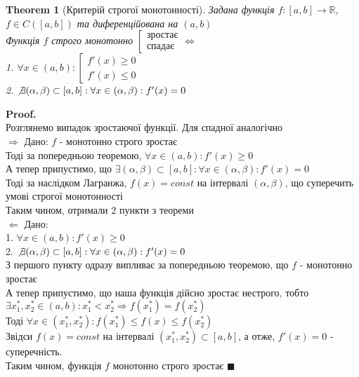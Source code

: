 \documentclass[a4paper, 14pt]{extarticle}
\def\bigline{\vspace{5mm}\\}
\def\rightproof{$\boxed{\Rightarrow}$ }
\def\leftproof{$\boxed{\Leftarrow}$ }
\theoremstyle{theoremdd}
\newtheorem{theorem}{Theorem}[subsection]
\theoremstyle{theoremdd}
\theoremstyle{theoremdd}
\theoremstyle{theoremdd}
\theoremstyle{theoremdd}
\theoremstyle{theoremdd}
\theoremstyle{theoremdd}
\theoremstyle{theoremdd}
\newenvironment{pf}{\vspace*{-3mm} \textbf{Proof. \\}}{$\blacksquare$}
\begin{document}
\begin{theorem}[Критерій строгої монотонності]
Задана функція $f: [a,b] \to \mathbb{R}$, $f \in C([a,b])$ та диференційована на $(a,b)$\\
Функція $f$ строго монотонно $\left[ \begin{gathered} \textrm{зростає} \\ \textrm{спадає} \end{gathered} \right. \iff$\\
 1. $\forall x \in (a,b): \left[ \begin{gathered} f'(x) \geq 0 \\ f'(x) \leq 0 \end{gathered} \right.$\\
 2. $\not\exists (\alpha, \beta) \subset [a,b]: \forall x \in (\alpha, \beta): f'(x) = 0$
\end{theorem}
\begin{pf}
Розглянемо випадок зростаючої функції. Для спадної аналогічно\\
\rightproof Дано: $f$ - монотонно строго зростає\\
Тоді за попередньою теоремою, $\forall x \in (a,b): f'(x) \geq 0$\\
А тепер припустимо, що $\exists (\alpha, \beta) \subset [a,b]: \forall x \in (\alpha, \beta): f'(x) = 0$\\
Тоді за наслідком Лагранжа, $f(x) = const$ на інтервалі $(\alpha, \beta)$, що суперечить умові строгої монотонності\\
Таким чином, отримали 2 пункти з теореми
\bigline
\leftproof Дано:\\
1. $\forall x \in (a,b): f'(x) \geq 0$\\
2. $\not\exists (\alpha, \beta) \subset [a,b]: \forall x \in (\alpha, \beta): f'(x) = 0$\\
З першого пункту одразу випливає за попередньою теоремою, що $f$ - монотонно зростає\\
А тепер припустимо, що наша функція дійсно зростає нестрого, тобто\\
$\exists x_1^*, x_2^* \in (a,b): x_1^* < x_2^* \Rightarrow f(x_1^*) = f(x_2^*)$\\
Тоді $\forall x \in (x_1^*,x_2^*): f(x_1^*) \leq f(x) \leq f(x_2^*)$\\
Звідси $f(x) = const$ на інтервалі $(x_1^*, x_2^*) \subset [a,b]$, а отже, $f'(x) = 0$ - суперечність.\\
Таким чином, функція $f$ монотонно строго зростає
\end{pf}
\end{document}
